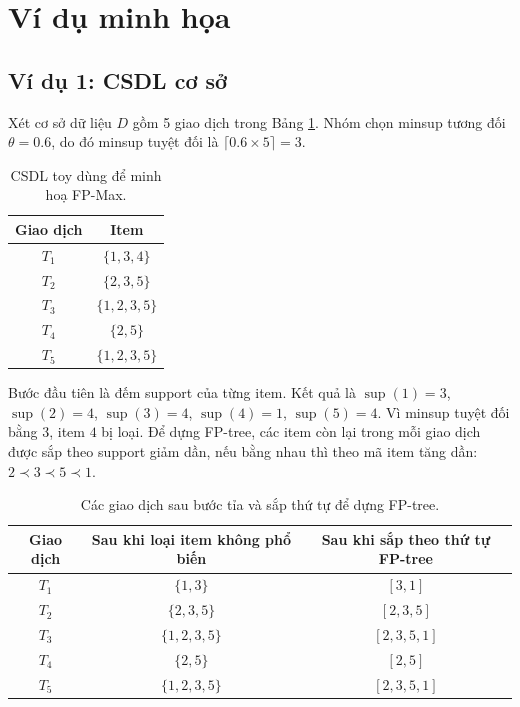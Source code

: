 \section{Ví dụ minh họa}
\label{sec:example}

\subsection{Ví dụ 1: CSDL cơ sở}

Xét cơ sở dữ liệu $D$ gồm 5 giao dịch trong Bảng \ref{tab:toy-db}. Nhóm chọn minsup tương đối $\theta = 0.6$, do đó minsup tuyệt đối là $\lceil 0.6 \times 5 \rceil = 3$.

\begin{table}[H]
    \centering
    \caption{CSDL toy dùng để minh hoạ FP-Max.}
    \label{tab:toy-db}
    \begin{tabular}{c c}
        \toprule
        Giao dịch & Item \\
        \midrule
        $T_1$ & $\{1,3,4\}$ \\
        $T_2$ & $\{2,3,5\}$ \\
        $T_3$ & $\{1,2,3,5\}$ \\
        $T_4$ & $\{2,5\}$ \\
        $T_5$ & $\{1,2,3,5\}$ \\
        \bottomrule
    \end{tabular}
\end{table}

Bước đầu tiên là đếm support của từng item. Kết quả là $\operatorname{sup}(1)=3$, $\operatorname{sup}(2)=4$, $\operatorname{sup}(3)=4$, $\operatorname{sup}(4)=1$, $\operatorname{sup}(5)=4$. Vì minsup tuyệt đối bằng 3, item $4$ bị loại. Để dựng FP-tree, các item còn lại trong mỗi giao dịch được sắp theo support giảm dần, nếu bằng nhau thì theo mã item tăng dần: $2 \prec 3 \prec 5 \prec 1$.

\begin{table}[H]
    \centering
    \caption{Các giao dịch sau bước tỉa và sắp thứ tự để dựng FP-tree.}
    \label{tab:toy-ordered}
    \begin{tabular}{c c c}
        \toprule
        Giao dịch & Sau khi loại item không phổ biến & Sau khi sắp theo thứ tự FP-tree \\
        \midrule
        $T_1$ & $\{1,3\}$ & $[3,1]$ \\
        $T_2$ & $\{2,3,5\}$ & $[2,3,5]$ \\
        $T_3$ & $\{1,2,3,5\}$ & $[2,3,5,1]$ \\
        $T_4$ & $\{2,5\}$ & $[2,5]$ \\
        $T_5$ & $\{1,2,3,5\}$ & $[2,3,5,1]$ \\
        \bottomrule
    \end{tabular}
\end{table}

